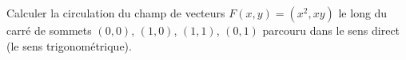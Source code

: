 
\begin{exercice}\label{exoOutilsMath-0060}

    Calculer la circulation du champ de vecteurs $F(x,y)=(x^2,xy)$ le long du carré de sommets $(0,0)$, $(1,0)$, $(1,1)$, $(0,1)$ parcouru dans le sens direct (le sens trigonométrique).

\end{exercice}
